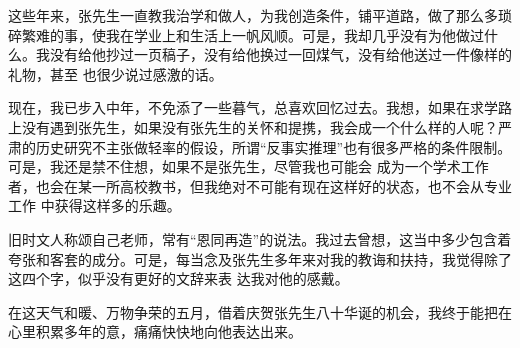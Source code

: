 \documentclass{article}
\begin{document}
这些年来，张先生一直教我治学和做人，为我创造条件，铺平道路，做了那么多琐碎繁难的事，使我在学业上和生活上一帆风顺。可是，我却几乎没有为他做过什么。我没有给他抄过一页稿子，没有给他换过一回煤气，没有给他送过一件像样的礼物，甚至
也很少说过感激的话。 

现在，我已步入中年，不免添了一些暮气，总喜欢回忆过去。我想，如果在求学路上没有遇到张先生，如果没有张先生的关怀和提携，我会成一个什么样的人呢？严肃的历史研究不主张做轻率的假设，所谓“反事实推理”也有很多严格的条件限制。可是，我还是禁不住想，如果不是张先生，尽管我也可能会
\newpage
成为一个学术工作者，也会在某一所高校教书，但我绝对不可能有现在这样好的状态，也不会从专业工作
中获得这样多的乐趣。 

旧时文人称颂自己老师，常有“恩同再造”的说法。我过去曾想，这当中多少包含着夸张和客套的成分。可是，每当念及张先生多年来对我的教诲和扶持，我觉得除了这四个字，似乎没有更好的文辞来表
达我对他的感戴。 

在这天气和暖、万物争荣的五月，借着庆贺张先生八十华诞的机会，我终于能把在心里积累多年的意，痛痛快快地向他表达出来。
\end{document}
